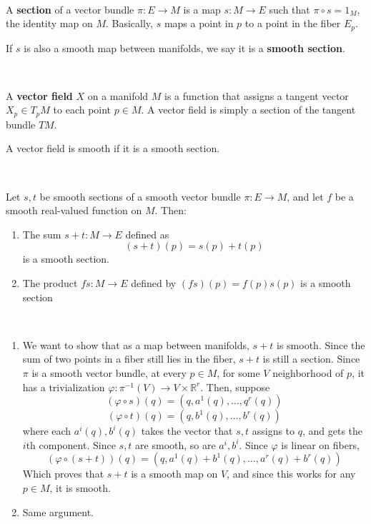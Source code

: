 \documentclass{article}
\begin{document}
\begin{definition}[Sections]
  \

  A \textbf{section} of a vector bundle $\pi: E \to M$ is a map $s: M \to E$ such that $\pi \circ s = 1_M$, the identity map on $M$. Basically, $s$ maps a point in $p$ to a point in the fiber $E_p$.

  If $s$ is also a smooth map between manifolds, we say it is a \textbf{smooth section}.
\end{definition}

\begin{definition}
  \

  A \textbf{vector field} $X$ on a manifold $M$ is a function that assigns a tangent vector $X_p \in T_pM$ to each point $p \in M$. A vector field is simply a section of the tangent bundle $TM$.

  A vector field is smooth if it is a smooth section.
\end{definition}

\begin{proposition}
  \

  Let $s,t$ be smooth sections of a smooth vector bundle $\pi: E\to M$, and let $f$ be a smooth real-valued function on $M$. Then:

  \begin{enumerate}
    \item The sum $s + t: M \to E$ defined as $$(s+t)(p) = s(p) + t(p)$$is a smooth section.
    \item The product $fs: M \to E$ defined by $(fs)(p) = f(p)s(p)$ is a smooth section
  \end{enumerate}
\end{proposition}

\begin{customproof}
  \

  \begin{enumerate}
    \item We want to show that as a map between manifolds, $s+t$ is smooth. Since the sum of two points in a fiber still lies in the fiber, $s+t$ is still a section. Since $\pi$ is a smooth vector bundle, at every $p\in M$, for some $V$ neighborhood of $p$, it has a trivialization $\varphi: \pi ^{-1}(V) \to V \times \mathbb{R}^r$. Then, suppose $$(\varphi \circ s)(q) = (q, a^1(q), \dots, q^r(q))$$$$(\varphi \circ t)(q) = (q, b^1(q), \dots, b^r(q))$$where each $a^i(q), b^i(q)$ takes the vector that $s, t$ assigns to $q$, and gets the $i$th component. Since $s,t$ are smooth, so are $a^i, b^i$. Since $\varphi$ is linear on fibers, $$(\varphi \circ (s+t))(q) = (q, a^1(q) + b^1(q), \dots, a^r(q) + b^r(q))$$Which proves that $s+t$ is a smooth map on $V$, and since this works for any $p \in M$, it is smooth.
    \item Same argument.
  \end{enumerate}
\end{customproof}
\end{document}
